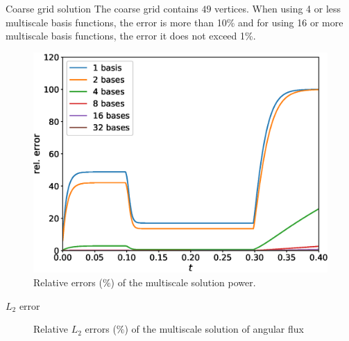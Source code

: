 \documentclass[10pt,pdf,hyperref={unicode}]{beamer}
\begin{document}
	\begin{frame}{Coarse grid solution}
		The coarse grid contains $49$ vertices.
		When using 4 or less multiscale basis functions, the error is more than 10\% and for using 16 or more multiscale basis functions, the error it does not exceed 1\%.
		\begin{figure}[h]
			\centering
			\includegraphics[width=0.5\linewidth]{small/power_error.eps} 
			\caption{Relative errors ($\%$) of the multiscale solution power.}
		\end{figure}
	\end{frame}

	\begin{frame}{$L_2$ error}
		\begin{figure}[h]
			\centering
			\quad
			\caption{Relative $L_2$ errors ($\%$) of the multiscale solution of angular flux}
		\end{figure}
	\end{frame}
\end{document}
